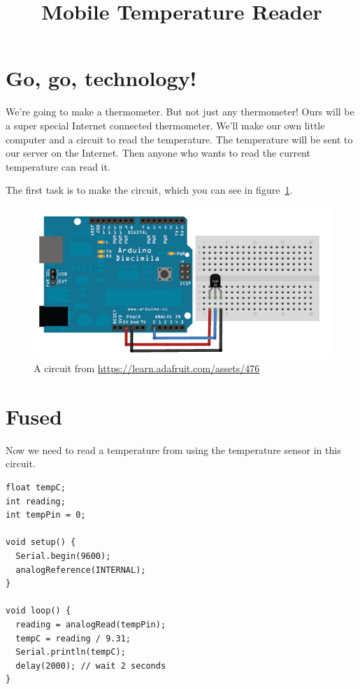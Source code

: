 \documentclass[a5paper]{tufte-book}
\title{Mobile Temperature Reader}
\author{}
\date{}
\begin{document}
\maketitle

\section*{Go, go, technology!}
We're going to make a thermometer.  But not just any thermometer!  Ours will be a super special Internet connected thermometer.  We'll make our own little computer and a circuit to read the temperature.  The temperature will be sent to our server on the Internet.  Then anyone who wants to read the current temperature can read it.

The first task is to make the circuit, which you can see in figure~\ref{fig:circuit}.

\begin{figure}
  \includegraphics[width=\textwidth]{images/temperature_tmp36fritz}
  \caption{A circuit from \url{https://learn.adafruit.com/assets/476}}
  \label{fig:circuit}
\end{figure}

\section*{Fused}

Now we need to read a temperature from using the temperature sensor in this circuit.

\begin{lstlisting}
float tempC;
int reading;
int tempPin = 0;

void setup() {
  Serial.begin(9600);
  analogReference(INTERNAL);
}

void loop() {
  reading = analogRead(tempPin);
  tempC = reading / 9.31;
  Serial.println(tempC);
  delay(2000); // wait 2 seconds
}

\end{lstlisting}
\end{document}
